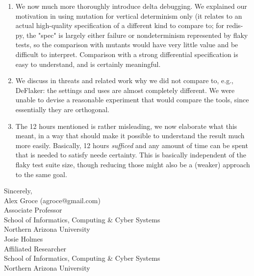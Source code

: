 \documentclass{letter}
\begin{document}
\begin{letter}{}
\begin{enumerate}
\item We now much more thoroughly introduce delta debugging.  We explained our motivation in using mutation for vertical determinism only (it relates to an actual high-quality specification of a different kind to compare to; for redis-py, the "spec" is largely either failure or nondeterminism represented by flaky tests, so the comparison with mutants would have very little value and be difficult to interpret.  Comparison with a strong differential specification is easy to understand, and is certainly meaningful.

\item We discuss in threats and related work why we did not compare to, e.g., DeFlaker:  the settings and uses are almost completely different.  We were unable to devise a reasonable experiment that would compare the tools, since essentially they are orthogonal.

\item The 12 hours mentioned is rather misleading, we now elaborate what
this meant, in a way that should make it possible to understand the
result much more easily.  Basically, 12 hours \emph{sufficed} and any
amount of time can be spent that is needed to satisfy neede certainty.
This is basically independent of the flaky test suite size, though
reducing those might also be a (weaker) approach to the same goal.
\end{enumerate}

  \closing{Sincerely,\\Alex Groce (agroce@gmail.com)\\Associate
    Professor\\
    School of Informatics, Computing \& Cyber Systems\\Northern
    Arizona University \vspace{0.1in}\\Josie Holmes\\Affiliated Researcher\\
    School of Informatics, Computing \& Cyber Systems\\Northern Arizona University}

\end{letter}
\end{document}
